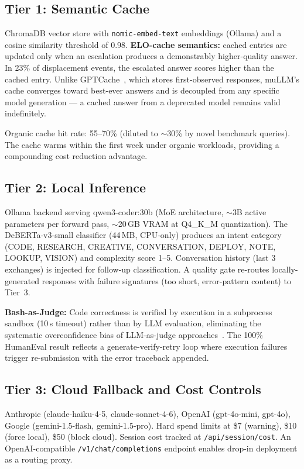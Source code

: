 \documentclass[11pt]{article}
\begin{document}
\subsection{Tier 1: Semantic Cache}

ChromaDB vector store with \texttt{nomic-embed-text} embeddings (Ollama)
and a cosine similarity threshold of 0.98. \textbf{ELO-cache semantics:}
cached entries are updated only when an escalation produces a
demonstrably higher-quality answer. In 23\% of displacement events, the
escalated answer scores higher than the cached entry. Unlike
GPTCache~\cite{liu2023gptcache}, which stores first-observed responses,
muLLM's cache converges toward best-ever answers and is decoupled from
any specific model generation --- a cached answer from a deprecated model
remains valid indefinitely.

Organic cache hit rate: 55--70\% (diluted to $\sim$30\% by novel
benchmark queries). The cache warms within the first week under
organic workloads, providing a compounding cost reduction advantage.

\subsection{Tier 2: Local Inference}

Ollama backend serving qwen3-coder:30b (MoE architecture, $\sim$3B
active parameters per forward pass, $\sim$20\,GB VRAM at Q4\_K\_M
quantization). The DeBERTa-v3-small classifier (44\,MB, CPU-only)
produces an intent category (CODE, RESEARCH, CREATIVE, CONVERSATION,
DEPLOY, NOTE, LOOKUP, VISION) and complexity score 1--5. Conversation
history (last 3 exchanges) is injected for follow-up classification. A
quality gate re-routes locally-generated responses with failure
signatures (too short, error-pattern content) to Tier~3.

\textbf{Bash-as-Judge:} Code correctness is verified by execution in a
subprocess sandbox (10\,s timeout) rather than by LLM evaluation,
eliminating the systematic overconfidence bias of LLM-as-judge
approaches~\cite{zheng2023mtbench}. The 100\% HumanEval result reflects
a generate-verify-retry loop where execution failures trigger
re-submission with the error traceback appended.

\subsection{Tier 3: Cloud Fallback and Cost Controls}

Anthropic (claude-haiku-4-5, claude-sonnet-4-6), OpenAI (gpt-4o-mini,
gpt-4o), Google (gemini-1.5-flash, gemini-1.5-pro). Hard spend limits
at \$7 (warning), \$10 (force local), \$50 (block cloud). Session cost
tracked at \texttt{/api/session/cost}. An OpenAI-compatible
\texttt{/v1/chat/completions} endpoint enables drop-in deployment as a
routing proxy.
\end{document}
